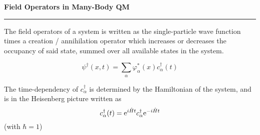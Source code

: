 
\begin{frame}
	\begin{block}{\color{white}\textbf{\Large{
					Field Operators in Many-Body QM
		}}}
		\vspace{-10pt}\rule{\textwidth}{0.5pt}
		\color{white}
		
		The field operators of a system is written as the single-particle wave function times a creation / annihilation operator which increases or decreases the occupancy of said state, summed over all available states in the system. 
	\end{block}
	{\large
		
		\begin{equation*} 
			\psi^\dagger(x, t) = \sum\limits_{\alpha}\varphi^{*}_\alpha(x)c^{\dagger}_{\alpha}(t)
		\end{equation*}
	}
	
	\begin{block}{}
		\color{white}
		The time-dependency of $c_\alpha^\dagger$ is determined by the Hamiltonian of the system, and is in the Heisenberg picture written as
		\begin{equation*}
			c_\alpha^\dagger(t) = \mathrm{e}^{i\hat{H}t}c_\alpha^\dagger\mathrm{e}^{-i\hat{H}t}
		\end{equation*}
	(with $\hbar  = 1$)
	\end{block}
	
	
\end{frame}